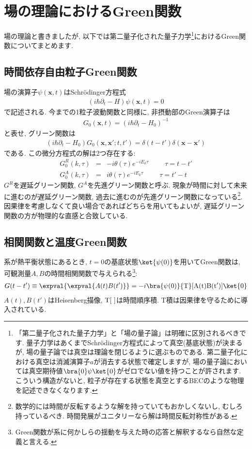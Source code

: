 \documentclass[10.5pt,a4paper]{jreport}
\begin{document}
\section{場の理論におけるGreen関数}
場の理論と書きましたが, 以下では第二量子化された量子力学\footnote{「第二量子化された量子力学」と「場の量子論」は明確に区別されるべきです. 量子力学はあくまでSchr\"odinger方程式によって真空(基底状態)が決まるが, 場の量子論では真空は理論を閉じるように選ぶものである. 第二量子化における真空は消滅演算子$a$が消去する状態で確定しますが, 場の量子論においては真空期待値$\bra{0}\psi\ket{0}$がゼロでない値を持つことが許されます. こういう構造がないと, 粒子が存在する状態を真空とするBECのような物理を記述できなくなります.}におけるGreen関数についてまとめます.
\subsection{時間依存自由粒子Green関数}
場の演算子$\psi(\bm{x}, t)$はSchr\"odinger方程式
\begin{eqnarray}
  \left(i\hbar\partial_t -H\right)\psi(\bm{x}, t) = 0
\end{eqnarray}
で記述される. 今までの1粒子波動関数と同様に, 非摂動部のGreen演算子は
\begin{eqnarray}
  G_0(\bm{x}, t) = \left(i\hbar\partial_t -H_0\right)^{-1}
\end{eqnarray}
と表せ, グリーン関数は
\begin{eqnarray}
  \left(i\hbar\partial_t -H_0\right)G_0(\bm{x}, \bm{x}'; t, t') = \delta(t-t')\delta(\bm{x} - \bm{x}')
\end{eqnarray}
である. この微分方程式の解は2つ存在する:
\begin{eqnarray}
  G_0^R(k, \tau) &=& -i\theta(\tau)e^{-iE_k\tau}\hspace{1cm}\tau = t-t'\\
  G_0^A(k, \tau) &=& i\theta(\tau)e^{-iE_k\tau}\hspace{1cm}\tau = t'-t
\end{eqnarray}
$G^R$を遅延グリーン関数, $G^A$を先進グリーン関数と呼ぶ. 現象が時間に対して未来に進むのが遅延グリーン関数, 過去に進むのが先進グリーン関数になっている\footnote{数学的には時間が反転するような解を持っていてもおかしくないし, むしろ持っているべき. 時間発展がユニタリーなら解は時間反転対称性がある. }. 因果律を考慮しなくて良い場合であればどちらを用いてもよいが, 遅延グリーン関数の方が物理的な直感と合致している.
\subsection{相関関数と温度Green関数}
系が熱平衡状態にあるとき, $t = 0$の基底状態$\ket{\psi(0)}$を用いてGreen関数は, 可観測量$A, B$の時間相関関数で与えられる\footnote{Green関数が系に何かしらの揺動を与えた時の応答と解釈するなら自然な定義と言える.}:
\begin{eqnarray}
  G(t-t') \equiv \expval{\expval{A(t)B(t')}} = -i\bra{\psi(0)}{\rm T}[A(t)B(t')]\ket{0}
\end{eqnarray}
$A(t), B(t')$はHeisenberg描像, ${\rm T}[\ ]$は時間順序積. T積は因果律を守るために導入されている.
\end{document}
